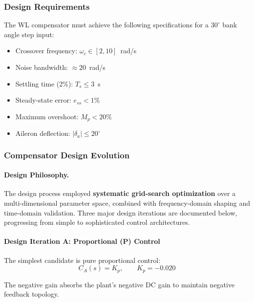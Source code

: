 \subsubsection{Design Requirements}

The WL compensator must achieve the following specifications for a $30^\circ$ bank angle step input:
\begin{itemize}
\item Crossover frequency: $\omega_c \in [2,10]$~rad/s
\item Noise bandwidth: $\approx 20$~rad/s
\item Settling time (2\%): $T_s \le 3$~s
\item Steady-state error: $e_{ss} < 1\%$
\item Maximum overshoot: $M_p < 20\%$
\item Aileron deflection: $|\delta_a| \le 20^\circ$
\end{itemize}

\subsubsection{Compensator Design Evolution}

\paragraph{Design Philosophy.}
The design process employed \textbf{systematic grid-search optimization} over a multi-dimensional parameter space, combined with frequency-domain shaping and time-domain validation. Three major design iterations are documented below, progressing from simple to sophisticated control architectures.

\paragraph{Design Iteration A: Proportional (P) Control}

The simplest candidate is pure proportional control:
\begin{equation}
C_A(s) = K_p, \qquad K_p = -0.020
\label{eq:design_A}
\end{equation}

The negative gain absorbs the plant's negative DC gain to maintain negative feedback topology.

